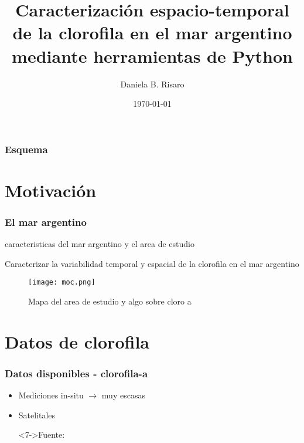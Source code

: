 \documentclass{beamer}
\title[Python para SIG]{Caracterización espacio-temporal de la clorofila en el mar argentino mediante herramientas de Python}
\subtitle{}
\author[Risaro, Daniela B]{Daniela B. Risaro\inst{1} \inst{2}}
\institute[SHN-UBA] %
{
	\inst{1}%
	Departamento de Oceanografía\\
	Servicio de Hidrografía Naval (SHN)
	\and
	\inst{2}%
	Facultad de Cs Exactas y Naturales\\
	Universidad de Buenos Aires (UBA)
}
\date{\today}
\begin{document}
\begin{frame}
 \titlepage
\end{frame}

\begin{frame}
\frametitle{Esquema }
\tableofcontents
\end{frame} 

\section{Motivación}

\begin{frame}
 \frametitle{El mar argentino}
 caracteristicas del mar argentino y el area de estudio
 
 Caracterizar la variabilidad temporal y espacial de la clorofila en el mar argentino
 
\begin{figure}
 \texttt{[image: moc.png]}
\caption{Mapa del area de estudio y algo sobre cloro a}
 \end{figure}
\end{frame}


\section{Datos de clorofila}

\begin{frame}[t]
 \frametitle{Datos disponibles - clorofila-a}
 

  \begin{itemize}
   \item<1-> Mediciones in-situ \pause $\rightarrow$ muy escasas
   \item<3-> Satelitales 
      


 
   \begin{figure}
   	
   \end{figure}

\item[]<7->\tiny{Fuente: \href{https://oceancolor.gsfc.nasa.gov/docs/odps_opdsmp.may2018.pdf}{}}
  \end{itemize}
\end{frame}
\end{document}
